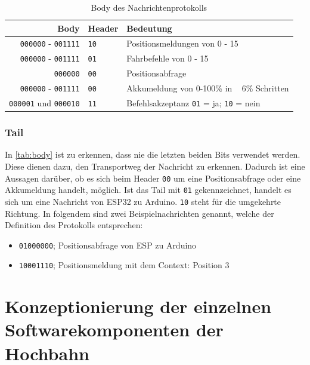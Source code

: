 \begin{table}[h]
	\begin{center}
		\begin{tabular}{r | l | l}
			Body & Header & Bedeutung \\
			\hline
			\texttt{000000} - \texttt{001111} & \texttt{10} & Positionsmeldungen von 0 - 15 \\
			\hline
			\texttt{000000} - \texttt{001111} & \texttt{01} & Fahrbefehle von 0 - 15 \\
			\hline
			\texttt{000000} & \texttt{00} & Positionsabfrage \\
			\hline
			\texttt{000000} - \texttt{001111} & \texttt{00} & Akkumeldung von 0-100\% in ~ 6\% Schritten \\
			\hline
			\texttt{000001} und \texttt{000010} & \texttt{11} & Befehlsakzeptanz \texttt{01} = ja; \texttt{10} = nein\\  
		\end{tabular}
	\end{center}
	\caption{\label{tab:body}Body des Nachrichtenprotokolls}
\end{table}

\subsection{Tail}
In \autoref{tab:body} ist zu erkennen, dass nie die letzten beiden Bits verwendet werden. Diese dienen dazu, den Transportweg der Nachricht zu erkennen. Dadurch ist eine Aussagen darüber, ob es sich beim Header \texttt{00} um eine Positionsabfrage oder eine Akkumeldung handelt, möglich.
Ist das Tail mit \texttt{01} gekennzeichnet, handelt es sich um eine Nachricht von ESP32 zu Arduino. \texttt{10} steht für die umgekehrte Richtung.
In folgendem sind zwei Beispielnachrichten genannt, welche der Definition des Protokolls entsprechen:

\begin{center}
	\begin{itemize}
		\item \texttt{01000000}; Positionsabfrage von ESP zu Arduino
		\item \texttt{10001110}; Positionsmeldung mit dem Context: Position 3  
	\end{itemize}
\end{center}
\newpage


\chapter{Konzeptionierung der einzelnen Softwarekomponenten der Hochbahn}
